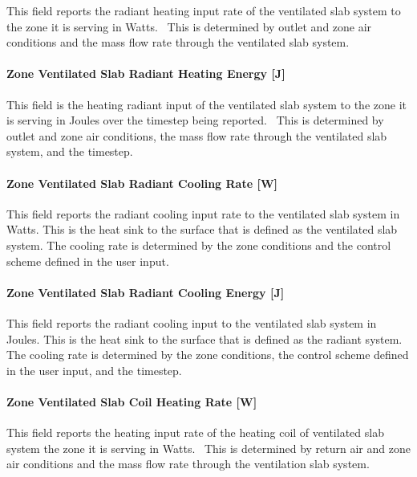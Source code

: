 This field reports the radiant heating input rate of the ventilated slab system to the zone it is serving in Watts.~ This is determined by outlet and zone air conditions and the mass flow rate through the ventilated slab system.

\paragraph{Zone Ventilated Slab Radiant Heating Energy {[}J{]}}\label{zone-ventilated-slab-radiant-heating-energy-j}

This field is the heating radiant input of the ventilated slab system to the zone it is serving in Joules over the timestep being reported.~ This is determined by outlet and zone air conditions, the mass flow rate through the ventilated slab system, and the timestep.

\paragraph{Zone Ventilated Slab Radiant Cooling Rate {[}W{]}}\label{zone-ventilated-slab-radiant-cooling-rate-w}

This field reports the radiant cooling input rate to the ventilated slab system in Watts. This is the heat sink to the surface that is defined as the ventilated slab system. The cooling rate is determined by the zone conditions and the control scheme defined in the user input.

\paragraph{Zone Ventilated Slab Radiant Cooling Energy {[}J{]}}\label{zone-ventilated-slab-radiant-cooling-energy-j}

This field reports the radiant cooling input to the ventilated slab system in Joules. This is the heat sink to the surface that is defined as the radiant system. The cooling rate is determined by the zone conditions, the control scheme defined in the user input, and the timestep.

\paragraph{Zone Ventilated Slab Coil Heating Rate {[}W{]}}\label{zone-ventilated-slab-coil-heating-rate-w}

This field reports the heating input rate of the heating coil of ventilated slab system the zone it is serving in Watts.~ This is determined by return air and zone air conditions and the mass flow rate through the ventilation slab system.

